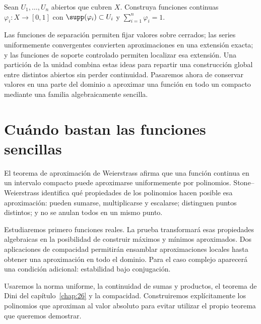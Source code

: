 \begin{ejercicio}\label{ej:lectura-12-3}
Sean $U_1,\ldots,U_n$ abiertos que cubren $X$. Construya funciones continuas $\varphi_i:X\to[0,1]$ con $\supp(\varphi_i)\subset U_i$ y $\sum_{i=1}^n\varphi_i=1$.
\end{ejercicio}


Las funciones de separación permiten fijar valores sobre cerrados; las series uniformemente convergentes convierten aproximaciones en una extensión exacta; y las funciones de soporte controlado permiten localizar esa extensión. Una partición de la unidad combina estas ideas para repartir una construcción global entre distintos abiertos sin perder continuidad. Pasaremos ahora de conservar valores en una parte del dominio a aproximar una función en todo un compacto mediante una familia algebraicamente sencilla.


\section{Cuándo bastan las funciones sencillas}
\label{lectura:28}
El teorema de aproximación de Weierstrass afirma que una función continua en un intervalo compacto puede aproximarse uniformemente por polinomios. Stone--Weierstrass identifica qué propiedades de los polinomios hacen posible esa aproximación: pueden sumarse, multiplicarse y escalarse; distinguen puntos distintos; y no se anulan todos en un mismo punto.

Estudiaremos primero funciones reales. La prueba transformará esas propiedades algebraicas en la posibilidad de construir máximos y mínimos aproximados. Dos aplicaciones de compacidad permitirán ensamblar aproximaciones locales hasta obtener una aproximación en todo el dominio. Para el caso complejo aparecerá una condición adicional: estabilidad bajo conjugación.

Usaremos la norma uniforme, la continuidad de sumas y productos, el teorema de Dini del capítulo~\ref{chap:26} y la compacidad. Construiremos explícitamente los polinomios que aproximan al valor absoluto para evitar utilizar el propio teorema que queremos demostrar.

